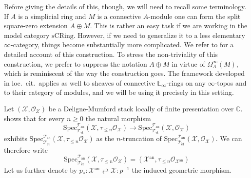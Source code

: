\documentclass[12pt,a4paper,reqno]{amsart}
\theoremstyle{plain}
\theoremstyle{definition}
\theoremstyle{remark}
\numberwithin{equation}{section}
\begin{document}
Before giving the details of this, though, we will need to recall some terminology.
If $A$ is a simplicial ring and $M$ is a connective $A$-module one can form the split square-zero extension $A \oplus M$.
This is rather an easy task if we are working in the model category $\mathrm{sCRing}$.
However, if we need to generalize it to a less elementary $\infty$-category, things become substantially more complicated.
We refer to \cite[Â§7.3.4]{Lurie_Higher_algebra} for a detailed account of this construction.
To stress the non-triviality of this construction, we prefer to suppress the notation $A \oplus M$ in virtue of $\Omega^\infty_A(M)$, which is reminiscent of the way the construction goes.
The framework developed in loc.\ cit.\ applies as well to sheaves of connective $\mathbb E_\infty$-rings on any $\infty$-topos and to their category of modules, and we will be using it precisely in this setting.
	
Let $({\mathcal X}, {\mathcal O}_{\mathcal X})$ be a {Deligne-Mumford\xspace} stack locally of finite presentation over $\mathbb C$.
 shows that for every $n \ge 0$ the natural morphism
\[ {\mathrm{Spec}^{{\mathcal T}_{\mathrm{an}}}_{{\mathcal T}_{\mathrm{\acute{e}t}}}}({\mathcal X}, \tau_{\le n} {\mathcal O}_{\mathcal X}) \to {\mathrm{Spec}^{{\mathcal T}_{\mathrm{an}}}_{{\mathcal T}_{\mathrm{\acute{e}t}}}}({\mathcal X}, {\mathcal O}_{\mathcal X}) \]
exhibits ${\mathrm{Spec}^{{\mathcal T}_{\mathrm{an}}}_{{\mathcal T}_{\mathrm{\acute{e}t}}}}({\mathcal X}, \tau_{\le n} {\mathcal O}_{\mathcal X})$ as the $n$-truncation of ${\mathrm{Spec}^{{\mathcal T}_{\mathrm{an}}}_{{\mathcal T}_{\mathrm{\acute{e}t}}}}({\mathcal X}, {\mathcal O}_{\mathcal X})$.
We can therefore write
\[ {\mathrm{Spec}^{{\mathcal T}_{\mathrm{an}}}_{{\mathcal T}_{\mathrm{\acute{e}t}}}}({\mathcal X}, \tau_{\le n} {\mathcal O}_{\mathcal X}) = ({\mathcal X}{^\mathrm{an}}, \tau_{\le n} {\mathcal O}_{{\mathcal X}{^\mathrm{an}}}) \]
Let us further denote by $p_* \colon {\mathcal X}{^\mathrm{an}} \rightleftarrows {\mathcal X} \colon p{^{-1}}$ the induced geometric morphism.
	
\end{document}
